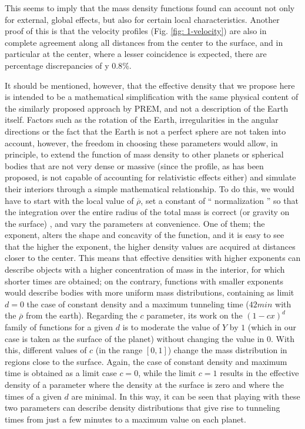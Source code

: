 \documentclass[aps,twocolumn,showpacs,preprintnumbers]{revtex4}
\begin{document}
    This seems to imply that the mass density functions found can account not only for external, global effects, but also for certain local characteristics. Another proof of this is that the velocity profiles (Fig. \ref{fig: 1-velocity}) are also in complete agreement along all distances from the center to the surface, and in particular at the center, where a lesser coincidence is expected, there are percentage discrepancies of y $ 0.8 \% $.
   
   It should be mentioned, however, that the effective density that we propose here is intended to be a mathematical simplification with the same physical content of the similarly proposed approach by PREM, and not a description of the Earth itself. Factors such as the rotation of the Earth, irregularities in the angular directions or the fact that the Earth is not a perfect sphere are not taken into account, however, the freedom in choosing these parameters would allow, in principle, to extend the function of mass density to other planets or spherical bodies that are not very dense or massive (since the profile, as has been proposed, is not capable of accounting for relativistic effects either) and simulate their interiors through a simple mathematical relationship. To do this, we would have to start with the local value of $ \overline{\rho} $, set a constant of `` normalization '' so that the integration over the entire radius of the total mass is correct (or gravity on the surface) , and vary the parameters at convenience. One of them; the exponent, alters the shape and concavity of the function, and it is easy to see that the higher the exponent, the higher density values are acquired at distances closer to the center. This means that effective densities with higher exponents can describe objects with a higher concentration of mass in the interior, for which shorter times are obtained; on the contrary, functions with smaller exponents would describe bodies with more uniform mass distributions, containing as limit $ d = 0 $ the case of constant density and a maximum tunneling time ($ 42 min $ with the $ \overline{\rho} $ from the earth). Regarding the $ c $ parameter, its work on the $ (1-c x)^d$ family of functions for a given $ d $ is to moderate the value of $ Y $ by $ 1 $ (which in our case is taken as the surface of the planet) without changing the value in $ 0 $. With this, different values of $ c $ (in the range $ [0,1] $) change the mass distribution in regions close to the surface. Again, the case of constant density and maximum time is obtained as a limit case $ c = 0 $, while the limit $ c = 1 $ results in the effective density of a parameter where the density at the surface is zero and where the times of a given $ d $ are minimal. In this way, it can be seen that playing with these two parameters can describe density distributions that give rise to tunneling times from just a few minutes to a maximum value on each planet.
    
\end{document}

